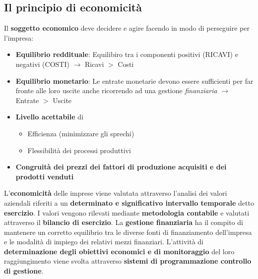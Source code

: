 \documentclass[12pt]{article}
\begin{document}
\subsection{Il principio di economicità}
Il \textbf{soggetto economico} deve decidere e agire facendo in modo di perseguire per l'impresa:
\begin{itemize}
    \item \textbf{Equilibrio reddituale}: Equilibiro tra i componenti positivi (RICAVI) e negativi (COSTI) $\rightarrow$ Ricavi $>$ Costi
    \item \textbf{Equilibrio monetario}: Le entrate monetarie devono essere sufficienti per far fronte alle loro uscite anche ricorrendo ad una gestione \textit{finanziaria} $\rightarrow$ Entrate $>$ Uscite
    \item \textbf{Livello acettabile} di
          \begin{itemize}
              \item Efficienza (minimizzare gli sprechi)
              \item Flessibilità dei processi produttivi
          \end{itemize}
    \item \textbf{Congruità dei prezzi dei fattori di produzione acquisiti e dei prodotti venduti}
\end{itemize}

L'\textbf{economicità} delle imprese viene valutata attraverso l'analisi dei valori aziendali riferiti a un \textbf{determinato e significativo intervallo temporale} detto \textbf{esercizio}. I valori vengono rilevati mediante \textbf{metodologia contabile} e valutati attraverso il \textbf{bilancio di esercizio}. La \textbf{gestione finanziaria} ha il compito di mantenere un corretto equilibrio tra le diverse fonti di finanziamento dell'impresa e le modalità di impiego dei relativi mezzi finanziari.
L'attività di \textbf{determinazione degli obiettivi economici e di monitoraggio} del loro raggiungimento viene svolta attraverso \textbf{sistemi di programmazione controllo di gestione}.
\newpage
\end{document}
